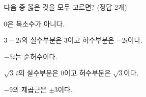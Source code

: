 다음 중 옳은 것을 모두 고르면? (정답 2개)
\begin{choicesv}{\rule[-3ex]{0pt}{8ex}$0$은 복소수가 아니다.}{\rule[-3ex]{0pt}{8ex}$3-2i$의 실수부분은 $3$이고 허수부분은 $-2i$이다.}{\rule[-3ex]{0pt}{8ex}$-5i$는 순허수이다.}{\rule[-3ex]{0pt}{8ex}$\sqrt{3}\,i$의 실수부분은 $0$이고 허수부분은 $\sqrt{3}$이다.}{\rule[-3ex]{0pt}{8ex}$-9$의 제곱근은 $\pm 3$이다.}\end{choicesv}

